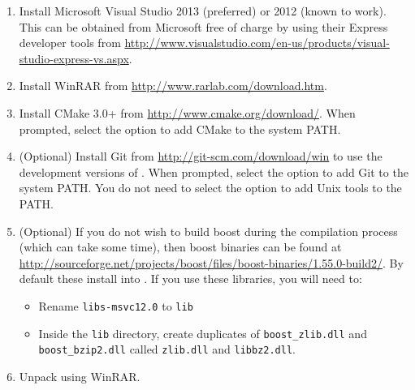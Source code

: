 \begin{enumerate}
  \item Install Microsoft Visual Studio 2013 (preferred) or 2012 (known to
  work). This can be obtained from Microsoft free of charge by using their
  Express developer tools from
  \url{http://www.visualstudio.com/en-us/products/visual-studio-express-vs.aspx}.
  \item Install WinRAR from \url{http://www.rarlab.com/download.htm}.
  \item Install CMake 3.0+ from \url{http://www.cmake.org/download/}. When
  prompted, select the option to add CMake to the system PATH.
  \item (Optional) Install Git from \url{http://git-scm.com/download/win} to use
  the development versions of \nekpp. When prompted, select the option to add
  Git to the system PATH. You do not need to select the option to add Unix tools
  to the PATH.
  \item (Optional) If you do not wish to build boost during the compilation
  process (which can take some time), then boost binaries can be found at
  \url{http://sourceforge.net/projects/boost/files/boost-binaries/1.55.0-build2/}. By
  default these install into . If you use these libraries, you will need to:
  \begin{itemize}
    \item Rename \texttt{libs-msvc12.0} to \texttt{lib}
    \item Inside the \texttt{lib} directory, create duplicates of
    \texttt{boost\_zlib.dll} and \texttt{boost\_bzip2.dll} called
    \texttt{zlib.dll} and \texttt{libbz2.dll}.
  \end{itemize}
  \item Unpack  using WinRAR.


\end{enumerate}
